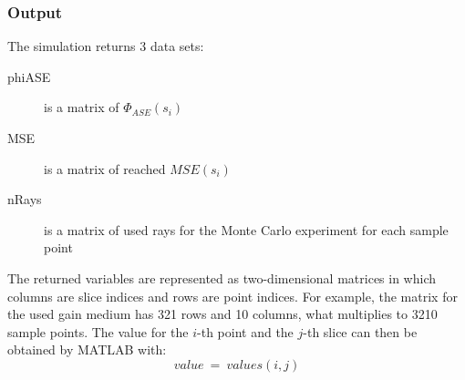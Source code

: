 \subsubsection{Output}
The simulation returns 3 data sets:
\begin{description}
  \item[phiASE] is a matrix of $\Phi_{ASE}(s_i)$
  \item[MSE] is a matrix of reached $MSE(s_i)$
  \item[nRays] is a matrix of used rays for the Monte Carlo experiment
    for each sample point
    
\end{description}
The returned variables are represented as two-dimensional matrices in
which columns are slice indices and rows are point indices.  For
example, the matrix for the used gain medium has 321 rows and 10
columns, what multiplies to 3210 sample points. The value for the
$i$-th point and the $j$-th slice can then be obtained by MATLAB with:
\[value~=~values(i,j)\]
